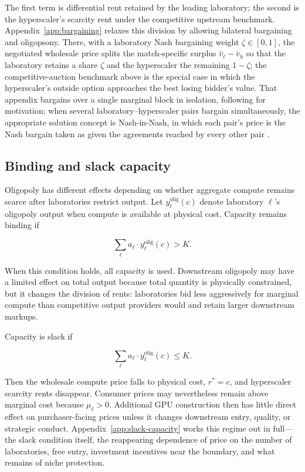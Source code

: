 \documentclass[11pt]{article}
\begin{document}
The first term is differential rent retained by the leading laboratory; the second is the hyperscaler's scarcity rent under the competitive upstream benchmark. Appendix~\ref{app:bargaining} relaxes this division by allowing bilateral bargaining and oligopsony. There, with a laboratory Nash bargaining weight $\zeta\in[0,1]$, the negotiated wholesale price splits the match-specific surplus $\widehat v_\ell-\bar v_h$ so that the laboratory retains a share $\zeta$ and the hyperscaler the remaining $1-\zeta$; the competitive-auction benchmark above is the special case in which the hyperscaler's outside option approaches the best losing bidder's value. That appendix bargains over a single marginal block in isolation, following \citet{hornWolinsky1988} for motivation; when several laboratory--hyperscaler pairs bargain simultaneously, the appropriate solution concept is Nash-in-Nash, in which each pair's price is the Nash bargain taken as given the agreements reached by every other pair \citep{collardWexlerEtAl2019}.

\subsection{Binding and slack capacity}

Oligopoly has different effects depending on whether aggregate compute remains scarce after laboratories restrict output. Let $y_\ell^{\mathrm{olig}}(c)$ denote laboratory $\ell$'s oligopoly output when compute is available at physical cost. Capacity remains binding if

\begin{equation}\sum_\ell a_\ell\cdot y_\ell^{\mathrm{olig}}(c)>K.\end{equation}

When this condition holds, all capacity is used. Downstream oligopoly may have a limited effect on total output because total quantity is physically constrained, but it changes the division of rents: laboratories bid less aggressively for marginal compute than competitive output providers would and retain larger downstream markups.

Capacity is slack if

\begin{equation}\sum_\ell a_\ell\cdot y_\ell^{\mathrm{olig}}(c)\leq K.\end{equation}

Then the wholesale compute price falls to physical cost, $r^*=c$, and hyperscaler scarcity rents disappear. Consumer prices may nevertheless remain above marginal cost because $\mu_\ell>0$. Additional GPU construction then has little direct effect on purchaser-facing prices unless it changes downstream entry, quality, or strategic conduct. Appendix~\ref{app:slack-capacity} works this regime out in full---the slack condition itself, the reappearing dependence of price on the number of laboratories, free entry, investment incentives near the boundary, and what remains of niche protection.
\end{document}

